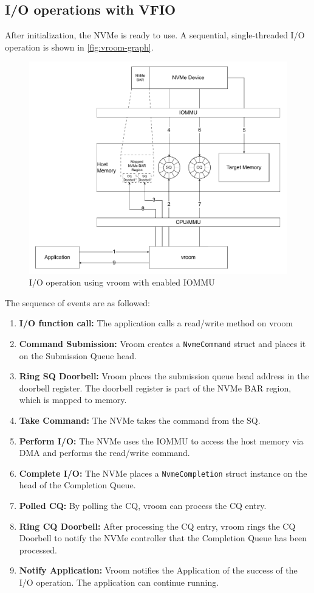\subsection{I/O operations with VFIO}
After initialization, the NVMe is ready to use. A sequential, single-threaded I/O operation is shown in \autoref{fig:vroom-graph}.
\begin{figure}
    \centering
    \includegraphics[width=\textwidth]{figures/vroomdiagram.pdf}
    \caption{I/O operation using vroom with enabled IOMMU}
    \label{fig:vroom-graph}
\end{figure}
The sequence of events are as followed:
\begin{enumerate}
    \item \textbf{I/O function call:} The application calls a read/write method on vroom
    \item \textbf{Command Submission:} Vroom creates a \texttt{NvmeCommand} struct and places it on the Submission Queue head.
    \item \textbf{Ring SQ Doorbell:} Vroom places the submission queue head address in the doorbell register. The doorbell register is part of the NVMe BAR region, which is mapped to memory.
    \item \textbf{Take Command:} The NVMe takes the command from the SQ.
    \item \textbf{Perform I/O:} The NVMe uses the IOMMU to access the host memory via DMA and performs the read/write command.
    \item \textbf{Complete I/O:} The NVMe places a \texttt{NvmeCompletion} struct instance on the head of the Completion Queue.
    \item \textbf{Polled CQ:} By polling the CQ, vroom can process the CQ entry.
    \item \textbf{Ring CQ Doorbell:} After processing the CQ entry, vroom rings the CQ Doorbell to notify the NVMe controller that the Completion Queue has been processed.
    \item \textbf{Notify Application:} Vroom notifies the Application of the success of the I/O operation. The application can continue running.
\end{enumerate}

